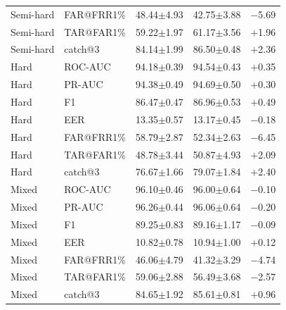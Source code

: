 \documentclass[11pt]{article}
\begin{document}
\begin{table}[!t]
\begin{minipage}[t]{0.48\textwidth}
\begin{tabular}{l l c c c}
Semi-hard & FAR@FRR1\% & 48.44$\pm$4.93 & 42.75$\pm$3.88 & $-$5.69 \\
Semi-hard & TAR@FAR1\% & 59.22$\pm$1.97 & 61.17$\pm$3.56 & $+$1.96 \\
Semi-hard & catch@3    & 84.14$\pm$1.99 & 86.50$\pm$0.48 & $+$2.36 \\
\midrule
Hard      & ROC-AUC    & 94.18$\pm$0.39 & 94.54$\pm$0.43 & $+$0.35 \\
Hard      & PR-AUC     & 94.38$\pm$0.49 & 94.69$\pm$0.50 & $+$0.30 \\
Hard      & F1         & 86.47$\pm$0.47 & 86.96$\pm$0.53 & $+$0.49 \\
Hard      & EER        & 13.35$\pm$0.57 & 13.17$\pm$0.45 & $-$0.18 \\
Hard      & FAR@FRR1\% & 58.79$\pm$2.87 & 52.34$\pm$2.63 & $-$6.45 \\
Hard      & TAR@FAR1\% & 48.78$\pm$3.44 & 50.87$\pm$4.93 & $+$2.09 \\
Hard      & catch@3    & 76.67$\pm$1.66 & 79.07$\pm$1.84 & $+$2.40 \\
\midrule
Mixed     & ROC-AUC    & 96.10$\pm$0.46 & 96.00$\pm$0.64 & $-$0.10 \\
Mixed     & PR-AUC     & 96.26$\pm$0.44 & 96.06$\pm$0.64 & $-$0.20 \\
Mixed     & F1         & 89.25$\pm$0.83 & 89.16$\pm$1.17 & $-$0.09 \\
Mixed     & EER        & 10.82$\pm$0.78 & 10.94$\pm$1.00 & $+$0.12 \\
Mixed     & FAR@FRR1\% & 46.06$\pm$4.79 & 41.32$\pm$3.29 & $-$4.74 \\
Mixed     & TAR@FAR1\% & 59.06$\pm$2.88 & 56.49$\pm$3.68 & $-$2.57 \\
Mixed     & catch@3    & 84.65$\pm$1.92 & 85.61$\pm$0.81 & $+$0.96 \\
\bottomrule
\end{tabular}
\label{tab:app_pan_bert}
\end{minipage}

\vspace{0.6em}


\end{table}
\end{document}
